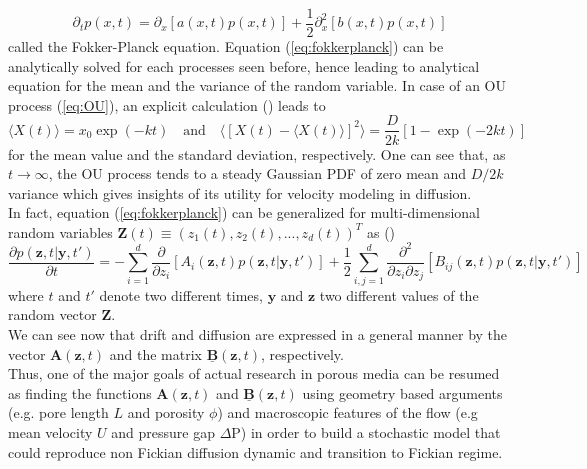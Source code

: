 \begin{equation}
\partial_t p(x,t) = \partial_x[a(x,t)p(x,t)] + \frac{1}{2}\partial^2_x [b(x,t)p(x,t)]
\label{eq:fokkerplanck} 
\end{equation}
called the Fokker-Planck equation. Equation (\ref{eq:fokkerplanck}) can be analytically solved for each processes seen before, hence leading to analytical equation for the mean and the variance of the random variable. 
In case of an OU process (\ref{eq:OU}), an explicit calculation (\cite[Sec. 3.8.4]{Gardiner1996}) leads to
\[
\langle X(t)\rangle=x_0 \exp(-kt) \quad\textrm{and}\quad \langle[X(t)-\langle X(t)\rangle]^2\rangle=\frac{D}{2k}[1-\exp(-2kt)]
\]
for the mean value and the standard deviation, respectively. One can see that, as $t\rightarrow\infty$, the OU process tends to a steady Gaussian PDF of zero mean and $D/2k$ variance which gives insights of its utility for velocity modeling in diffusion. \\
In fact, equation (\ref{eq:fokkerplanck}) can be generalized for multi-dimensional random variables $\textbf{Z}(t)\equiv(z_1(t),z_2(t),...,z_d(t))^T$ as (\citet[Sec. 3.5.2]{Gardiner1996}) 
\begin{equation}
\frac{\partial p(\textbf{z},t|\textbf{y},t')}{\partial t} =
-\sum_{i=1}^d\frac{\partial}{\partial z_i}[A_i(\textbf{z},t)p(\textbf{z},t|\textbf{y},t')]
+ \frac{1}{2}\sum_{i,j=1}^d\frac{\partial^2 }{\partial z_i \partial z_j}[B_{ij}(\textbf{z},t)p(\textbf{z},t|\textbf{y},t')]
\label{eq:mdfp}
\end{equation}
where $t$ and $t'$ denote two different times, $\textbf{y}$ and $\textbf{z}$ two different values of the random vector $\textbf{Z}$.\\ 
We can see now that drift and diffusion are expressed in a general manner by the vector $\textbf{A}(\textbf{z},t)$ and the matrix $\underline{\textbf{B}}(\textbf{z},t)$, respectively.\\
Thus, one of the major goals of actual research in porous media can be resumed as finding the functions $\textbf{A}(\textbf{z},t)$ and $\underline{\textbf{B}}(\textbf{z},t)$ using geometry based arguments (e.g. pore length $L$ and porosity $\phi$) and macroscopic features of the flow (e.g mean velocity $U$ and pressure gap $\Delta\textrm{P}$) in order to build a stochastic model that could reproduce non Fickian diffusion dynamic and transition to Fickian regime.\\

